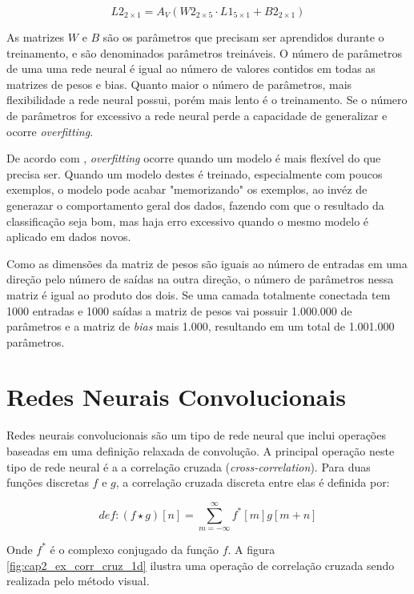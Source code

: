 \begin{equation}
	L2_{2 \times 1}=A_V \left( W2_{2 \times 5} \cdot L1_{5 \times 1}
		+ B2_{2 \times 1} \right)
\end{equation}

As matrizes $W$ e $B$ são os parâmetros que precisam ser aprendidos durante o
treinamento, e são denominados parâmetros treináveis. O número de parâmetros
de uma uma
rede neural é igual ao número de valores contidos em todas as matrizes de pesos
e bias. Quanto maior o número de parâmetros, mais flexibilidade a rede neural
possui, porém mais lento é o treinamento. Se o número de parâmetros for
excessivo a rede neural perde a capacidade de generalizar e ocorre
\emph{overfitting}.

De acordo com \cite{hawkins2004problem}, \emph{overfitting} ocorre quando um
modelo é mais flexível do que precisa ser. Quando um modelo destes é treinado,
especialmente com poucos exemplos, o modelo pode acabar "memorizando" os
exemplos, ao invéz de generazar o comportamento geral dos dados, fazendo
com que o resultado da classificação seja bom, mas haja erro excessivo
quando o mesmo modelo é aplicado em dados novos.

Como as dimensões da matriz de pesos são iguais ao número de entradas em uma
direção pelo número de saídas na outra direção, o número de parâmetros nessa
matriz é igual ao produto dos dois. Se uma camada totalmente conectada tem 1000
entradas e 1000 saídas a matriz de pesos vai possuir 1.000.000 de parâmetros
e a matriz de \emph{bias} mais 1.000, resultando em um total de 1.001.000
parâmetros.

\section{Redes Neurais Convolucionais}
Redes neurais convolucionais são um tipo de rede neural que inclui operações
baseadas em uma definição relaxada de convolução. A principal operação
neste tipo de rede neural é a a correlação cruzada (\emph{cross-correlation}).
Para duas funções discretas $f$ e $g$, a correlação cruzada discreta entre
elas é definida por:

\begin{equation}
	def: (f \star g)[n] = \sum_{m=-\infty}^{\infty} f^*[m]g[m+n]
\end{equation}

Onde $f^*$ é o complexo conjugado da função $f$. A figura
\ref{fig:cap2_ex_corr_cruz_1d} ilustra uma operação de correlação cruzada sendo
realizada pelo método visual.


